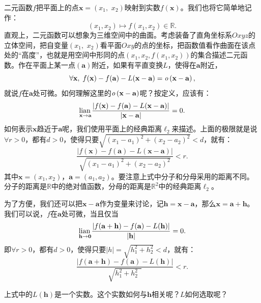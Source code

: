 \documentclass[12pt,UTF8]{ctexbook}
\begin{document}
二元函数$f$把平面上的点$\mathbf{x} = (x_1,\,\, x_2)$映射到实数$f(\mathbf{x})$。我们也将它简单地记作：
$$ (x_1, x_2) \mapsto f(x_1, x_2) \in \mathbb{R}.$$
直观上，二元函数可以想象为三维空间中的曲面。考虑装备了直角坐标系$Oxyz$的立体空间，把自变量$(x_1,\,\, x_2)$看平面$Oxy$的点的坐标，把函数值看作曲面在该点处的“高度”，也就是用空间中形同的点$(x_1, x_2, f(x_1, x_2))$的集合描述二元函数。作在平面上某一点$(\mathbf{a})$附近，如果有平直变换$L$，使得在$\mathbf{a}$附近，
$$ \forall \mathbf{x}, \; f(\mathbf{x}) - f(\mathbf{a}) - L(\mathbf{x} - \mathbf{a}) = \mathit{o}\left(\mathbf{x} - \mathbf{a}\right), $$
就说$f$在$\mathbf{a}$处可微。如何理解这里的$\mathit{o}\left(\mathbf{x} - \mathbf{a}\right)$呢？按定义，应该有：
$$ \underset{\mathbf{x} \to \mathbf{a}}{\operatorname{lian}\,} \frac{\left|f(\mathbf{x}) - f(\mathbf{a}) - L(\mathbf{x} - \mathbf{a})\right|}{\left|\mathbf{x} - \mathbf{a}\right|} = 0.$$
如何表示$\mathbf{x}$趋近于$\mathbf{a}$呢，我们使用平面上的经典距离$\ell_2$来描述。上面的极限就是说$\forall r > 0$，都有$d > 0$，使得只要$\sqrt{(x_1 - a_1)^2 + (x_2 - a_2)^2} < d$，就有：
$$ \frac{\left|f(\mathbf{x}) - f(\mathbf{a}) - L(\mathbf{x} - \mathbf{a})\right|}{\sqrt{(x_1 - a_1)^2 + (x_2 - a_2)^2}} < r. $$
其中$\mathbf{x} = (x_1, x_2)$，$\mathbf{a} = (a_1, a_2)$。要注意上式中分子和分母采用的距离不同。分子的距离是$\mathbb{R}$中的绝对值函数，分母的距离是$\mathbb{R}^2$中的经典距离$\ell_2$。

为了方便，我们还可以把$\mathbf{x} - \mathbf{a}$作为变量来讨论，记$\mathbf{h} = \mathbf{x} - \mathbf{a}$，那么$\mathbf{x} = \mathbf{a} + \mathbf{h}$。我们可以说，$f$在$\mathbf{a}$处可微，当且仅当
$$ \underset{\mathbf{h} \to \mathbf{0}}{\operatorname{lian}\,} \frac{\left|f(\mathbf{a} + \mathbf{h}) - f(\mathbf{a}) - L(\mathbf{h})\right|}{\left|\mathbf{h}\right|} = 0.$$
即$\forall r > 0$，都有$d > 0$，使得只要$|h| = \sqrt{h_1^2 + h_2^2} < d$，就有：
$$  \frac{\left|f(\mathbf{a} + \mathbf{h}) - f(\mathbf{a}) - L(\mathbf{h})\right|}{\sqrt{h_1^2 + h_2^2\phantom{0}}} < r.$$

上式中的$L(\mathbf{h})$是一个实数。这个实数如何与$\mathbf{h}$相关呢？$L$如何选取呢？
\end{document}
